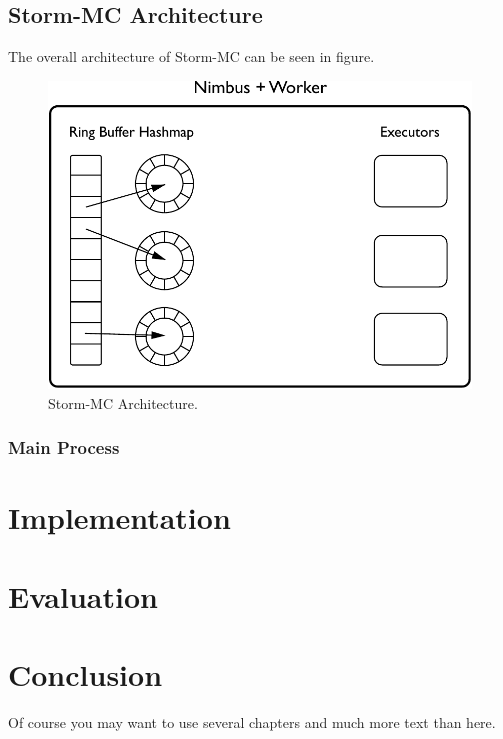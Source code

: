 \documentclass[bsc,logo,frontabs,twoside,singlespacing,normalheadings,parskip]{infthesis}     %
\begin{document}
\section{Storm-MC Architecture}

The overall architecture of Storm-MC can be seen in figure.

\begin{figure}[!htb]
	\centering
	\includegraphics[scale=0.7]{pdf/storm_mc_arch.pdf}
	\caption{Storm-MC Architecture.}
	\label{fig:architecture}
\end{figure}

\subsection{Main Process}



\chapter{Implementation}




\chapter{Evaluation}




\chapter{Conclusion}

Of course
you may want to use several chapters and much more text than here.



\end{document}
